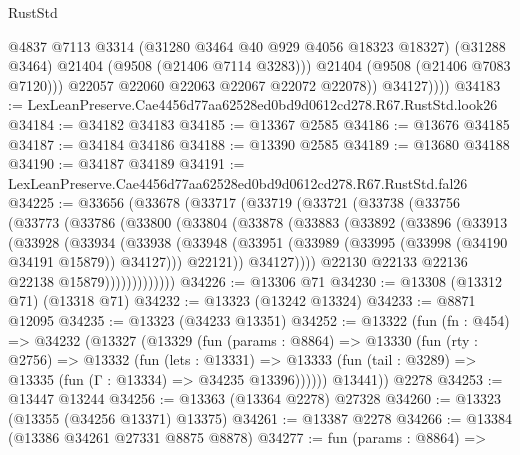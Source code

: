 \begin{lexlean}{RustStd}
\begin{coremodule}
                    @4837
                    @7113
                    @3314
                    (@31280 @3464 @40 @929 @4056 @18323 @18327)
                    (@31288 @3464)
                    @21404
                    (@9508 (@21406 @7114 @3283)))
                  @21404
                  (@9508 (@21406 @7083 @7120)))
                @22057
                @22060
                @22063
                @22067
                @22072
                @22078))
            @34127))))
@34183 := LexLeanPreserve.Cae4456d77aa62528ed0bd9d0612cd278.R67.RustStd.look26
@34184 := @34182 @34183
@34185 := @13367 @2585
@34186 := @13676 @34185
@34187 := @34184 @34186
@34188 := @13390 @2585
@34189 := @13680 @34188
@34190 := @34187 @34189
@34191 := LexLeanPreserve.Cae4456d77aa62528ed0bd9d0612cd278.R67.RustStd.fal26
@34225 := @33656
    (@33678
      (@33717
        (@33719
          (@33721
            (@33738
              (@33756
                (@33773
                  (@33786
                    (@33800
                      (@33804
                        (@33878
                          (@33883
                            (@33892
                              (@33896
                                (@33913
                                  (@33928
                                    (@33934
                                      (@33938
                                        (@33948
                                          (@33951
                                            (@33989
                                              (@33995 (@33998 (@34190 @34191 @15879)) @34127)))
                                          @22121))
                                      @34127))))
                              @22130
                              @22133
                              @22136
                              @22138
                              @15879)))))))))))))
@34226 := @13306 @71
@34230 := @13308 (@13312 @71) (@13318 @71)
@34232 := @13323 (@13242 @13324)
@34233 := @8871 @12095
@34235 := @13323 (@34233 @13351)
@34252 := @13322
    (fun (fn : @454) =>
    @34232
      (@13327
        (@13329
          (fun (params : @8864) =>
          @13330
            (fun (rty : @2756) =>
            @13332
              (fun (lets : @13331) =>
              @13333 (fun (tail : @3289) => @13335 (fun (Γ : @13334) => @34235 @13396))))))
        @13441))
    @2278
@34253 := @13447 @13244
@34256 := @13363 (@13364 @2278) @27328
@34260 := @13323 (@13355 (@34256 @13371) @13375)
@34261 := @13387 @2278
@34266 := @13384 (@13386 @34261 @27331 @8875 @8878)
@34277 := fun (params : @8864) =>

\end{coremodule}
\end{lexlean}
